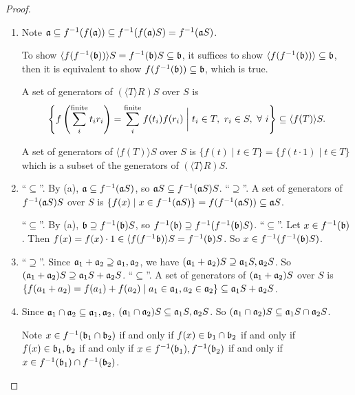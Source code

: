 \begin{proof}
    \begin{enumerate}
        \item 
            Note $\mathfrak{a} \subseteq f^{-1}(f(\mathfrak{a})) \subseteq f^{-1}(f(\mathfrak{a}) S) = f^{-1}(\mathfrak{a} S)$. \par
            To show $\langle f(f^{-1}(\mathfrak{b})) \rangle S = f^{-1}(\mathfrak{b})S \subseteq \mathfrak{b}$, it suffices to show $\langle f(f^{-1}(\mathfrak{b})) \rangle \subseteq \mathfrak{b}$, then it is equivalent to show $f(f^{-1}(\mathfrak{b})) \subseteq \mathfrak{b}$, which is true. \par 
            A set of generators of $(\langle T \rangle R)S$ over $S$ is 
            \[\left\{f\left(\sum_i^{\text{finite}}t_ir_i\right) = \sum_i^{\text{finite}} f(t_i)f(r_i) \mathrel{\bigg |} t_i \in T,\ r_i \in S, \ \forall \  i\right\} \subseteq \langle f(T) \rangle S.\] 
            \par A set of generators of $\langle f(T) \rangle S$ over $S$ is $\{f(t) \mid t \in T\} = \{f(t \cdot 1) \mid t \in T\}$ which is a subset of the generators of $(\langle T \rangle R)S$.
        \item 
            ``$\subseteq$''. By (a), $\mathfrak{a} \subseteq f^{-1}(\mathfrak{a} S)$, so $\mathfrak{a} S \subseteq f^{-1}(\mathfrak{a} S)S$. ``$\supseteq$''. A set of generators of $f^{-1}(\mathfrak{a} S)S$ over $S$ is $\{f(x) \mid x \in f^{-1}(\mathfrak{a} S)\} = f(f^{-1}(\mathfrak{a} S)) \subseteq \mathfrak{a} S$. \par
            ``$\subseteq$''. By (a), $\mathfrak{b} \supseteq f^{-1}(\mathfrak{b})S$, so $f^{-1}(\mathfrak{b}) \supseteq f^{-1}(f^{-1}(\mathfrak{b})S)$. ``$\subseteq$''. Let $x \in f^{-1}(\mathfrak{b})$. Then $f(x) = f(x) \cdot 1 \in \langle f(f^{-1}\mathfrak{b}) \rangle S = f^{-1}(\mathfrak{b})S$. So $x \in f^{-1}(f^{-1}(\mathfrak{b})S)$.
        \item ``$\supseteq$''. Since $\mathfrak{a}_1 + \mathfrak{a}_2 \supseteq \mathfrak{a}_1,\mathfrak{a}_2$, we have $(\mathfrak{a}_1+\mathfrak{a}_2)S \supseteq \mathfrak{a}_1S,\mathfrak{a}_2S$. So $(\mathfrak{a}_1+\mathfrak{a}_2)S \supseteq \mathfrak{a}_1S + \mathfrak{a}_2S$. ``$\subseteq$''. A set of generators of $(\mathfrak{a}_1+\mathfrak{a}_2)S$ over $S$ is $\{f(a_1+a_2) = f(a_1) + f(a_2) \mid a_1 \in \mathfrak{a}_1,a_2 \in \mathfrak{a}_2\} \subseteq \mathfrak{a}_1 S + \mathfrak{a}_2 S$.         
        \item 
            Since $\mathfrak{a}_1 \cap \mathfrak{a}_2 \subseteq \mathfrak{a}_1,\mathfrak{a}_2$, $(\mathfrak{a}_1 \cap \mathfrak{a}_2)S \subseteq \mathfrak{a}_1S,\mathfrak{a}_2S$. So $(\mathfrak{a}_1 \cap \mathfrak{a}_2) S \subseteq \mathfrak{a}_1 S \cap \mathfrak{a}_2 S$. \par
            Note $x \in f^{-1}(\mathfrak{b}_1 \cap \mathfrak{b}_2)$ if and only if $f(x) \in \mathfrak{b}_1 \cap \mathfrak{b}_2$ if and only if $f(x) \in \mathfrak{b}_1,\mathfrak{b}_2$ if and only if $x \in f^{-1}(\mathfrak{b}_1),f^{-1}(\mathfrak{b}_2)$ if and only if $x \in f^{-1}(\mathfrak{b}_1) \cap f^{-1}(\mathfrak{b}_2)$.

\end{enumerate}
\end{proof}
